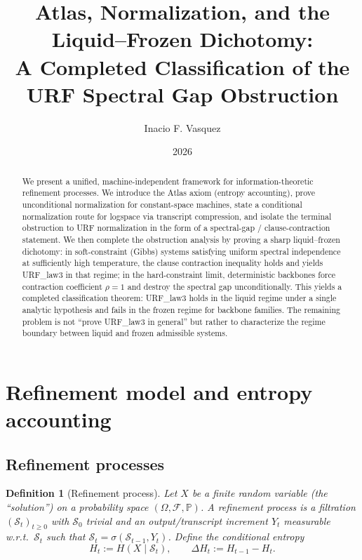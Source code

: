\documentclass[11pt]{article}
\title{Atlas, Normalization, and the Liquid--Frozen Dichotomy:\\
A Completed Classification of the URF Spectral Gap Obstruction}
\author{Inacio F. Vasquez}
\date{2026}
\newtheorem{definition}{Definition}
\begin{document}
\maketitle

\begin{abstract}
We present a unified, machine-independent framework for information-theoretic refinement processes.
We introduce the Atlas axiom (entropy accounting), prove unconditional normalization for constant-space machines,
state a conditional normalization route for logspace via transcript compression, and isolate the terminal obstruction
to URF normalization in the form of a spectral-gap / clause-contraction statement.
We then complete the obstruction analysis by proving a sharp liquid--frozen dichotomy: in soft-constraint (Gibbs)
systems satisfying uniform spectral independence at sufficiently high temperature, the clause contraction inequality
holds and yields URF\_law3 in that regime; in the hard-constraint limit, deterministic backbones force contraction
coefficient $\rho=1$ and destroy the spectral gap unconditionally. This yields a completed classification theorem:
URF\_law3 holds in the liquid regime under a single analytic hypothesis and fails in the frozen regime for backbone
families. The remaining problem is not ``prove URF\_law3 in general'' but rather to characterize the regime boundary
between liquid and frozen admissible systems.
\end{abstract}

\section{Refinement model and entropy accounting}

\subsection{Refinement processes}

\begin{definition}[Refinement process]
Let $X$ be a finite random variable (the ``solution'') on a probability space $(\Omega,\mathcal F,\mathbb P)$.
A \emph{refinement process} is a filtration $(\mathcal S_t)_{t\ge 0}$ with $\mathcal S_0$ trivial and
an output/transcript increment $Y_t$ measurable w.r.t.\ $\mathcal S_t$ such that $\mathcal S_t=\sigma(\mathcal S_{t-1},Y_t)$.
Define the conditional entropy
\[
H_t := H(X \mid \mathcal S_t),
\qquad
\Delta H_t := H_{t-1}-H_t.
\]
\end{definition}
\end{document}
